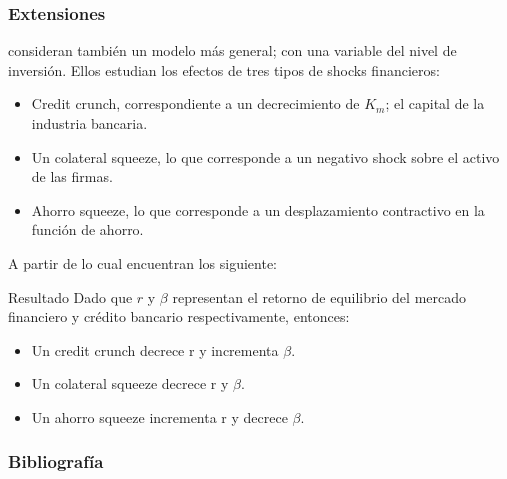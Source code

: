 \documentclass[10pt, xcolor=table, x11names]{beamer}
\begin{document}
\begin{frame}
    \frametitle{{\normalsize Extensiones} {}}
  \cite{Tirole1997} consideran también un modelo más general; con una variable del nivel de inversión. Ellos estudian los efectos de tres tipos de shocks financieros:
    \begin{itemize}
        \item Credit crunch, correspondiente a un decrecimiento de $K_{m}$; el capital de la industria bancaria.
        \item Un colateral squeeze, lo que corresponde a un negativo shock sobre el activo de las firmas.
        \item Ahorro squeeze, lo que corresponde a un desplazamiento contractivo en la función de ahorro.
    \end{itemize}
      A partir de lo cual encuentran los siguiente:
      \begin{block} {Resultado}
        Dado que $r$ y $\beta$ representan el retorno de equilibrio del mercado financiero y crédito bancario respectivamente, entonces:
        \begin{itemize}
            \item Un credit crunch decrece r y incrementa $\beta$.
            \item Un colateral squeeze decrece r y  $\beta$.
            \item Un ahorro squeeze incrementa r y decrece $\beta$.
        \end{itemize}  
      \end{block}
\end{frame}


\begin{frame}[allowframebreaks]
    \frametitle{{\large 
            Bibliografía}}
    \renewcommand{\refname}{Referencias}
    
    
\end{frame}
\end{document}
